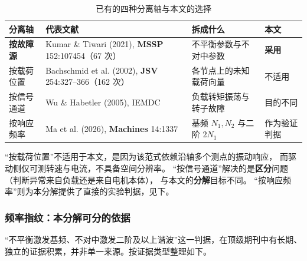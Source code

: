 \documentclass[11pt,a4paper]{ctexart}
\begin{document}
\begin{table}[h]
\centering
\caption{已有的四种分离轴与本文的选择}
\small
\begin{tabular}{@{}p{2.3cm}p{3.9cm}p{3.4cm}p{2.2cm}@{}}
\toprule
分离轴 & 代表文献 & 拆成什么 & 本文 \\
\midrule
\textbf{按故障源} & Kumar \& Tiwari (2021), \textbf{MSSP} 152:107454（67 次）
& 不平衡参数与不对中参数 & \textbf{采用} \\
按载荷位置 & Bachschmid et al. (2002), \textbf{JSV} 254:327--366（162 次）
& 各节点上的未知载荷向量 & 不适用 \\
按信号通道 & Wu \& Habetler (2005), IEMDC
& 负载转矩振荡与转子故障 & 目的不同 \\
按响应频率 & Ma et al. (2026), \textbf{Machines} 14:1337
& 基频 \(N_1,N_2\) 与二阶 \(2N_1\) & 作为验证判据 \\
\bottomrule
\end{tabular}
\end{table}

\noindent
“按载荷位置”不适用于本文，是因为该范式依赖沿轴多个测点的振动响应，
而驱动侧仅可测转速与电流，不具备空间分辨率。
“按信号通道”解决的是\textbf{区分}问题（判断异常来自负载还是来自电机本体），
与本文的\textbf{分解}目标不同。
“按响应频率”则为本分解提供了直接的实验判据，见下。

\subsubsection{频率指纹：本分解可分的依据}

“不平衡激发基频、不对中激发二阶及以上谐波”这一判据，在顶级期刊中有长期、
独立的证据积累，并非单一来源。按证据类型整理如下。
\end{document}

